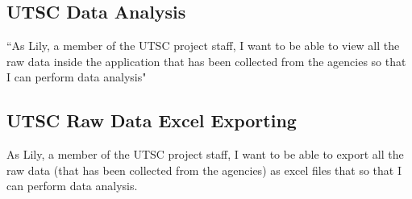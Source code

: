 \documentclass[12pt]{article}
\begin{document}
\subsection{UTSC Data Analysis}
``As Lily, a member of the UTSC project staff, I want to be able to view all the raw data inside the application that has been collected from the agencies so that I can perform data analysis" 

\subsection{UTSC Raw Data Excel Exporting }
As Lily, a member of the UTSC project staff, I want to be able to export all the raw data (that has been collected from the agencies) as excel files that so that I can perform data analysis. 

\newpage


\end{document}
